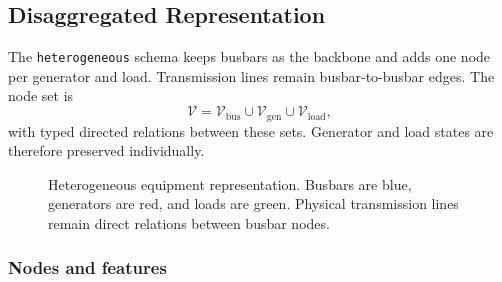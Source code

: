 


\subsection{Disaggregated Representation}
\label{sec:heterogeneous-graph-representation}

The \texttt{heterogeneous} schema keeps busbars as the backbone and adds one node
per generator and load. Transmission lines remain busbar-to-busbar edges. The
node set is
\begin{equation}
  \mathcal{V} =
  \mathcal{V}_{\mathrm{bus}}
  \cup \mathcal{V}_{\mathrm{gen}}
  \cup \mathcal{V}_{\mathrm{load}},
  \label{eq:heterogeneous-node-set}
\end{equation}
with typed directed relations between these sets. Generator and load states are
therefore preserved individually.

\begin{figure}[H]
  \centering
  \resizebox{0.92\linewidth}{!}{}
  \caption{Heterogeneous equipment representation. Busbars are blue, generators
  are red, and loads are green. Physical transmission lines remain direct
  relations between busbar nodes.}
  \label{fig:heterogeneous-equipment-graph}
\end{figure}

\subsubsection{Nodes and features}
\label{subsec:heterogeneous-nodes}

